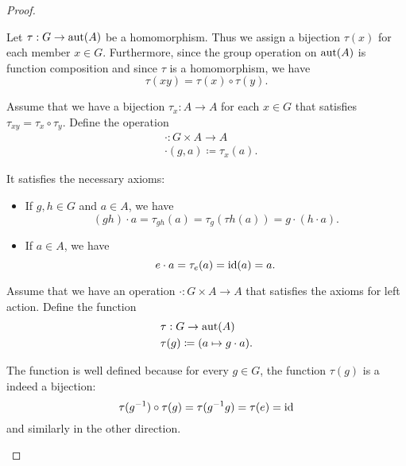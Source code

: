 \begin{proof}
  \begin{description}
     Let \( \tau: G \to \operatorname{aut}(A) \) be a homomorphism. Thus we assign a bijection \( \tau(x) \) for each member \( x \in G \). Furthermore, since the group operation on \( \operatorname{aut}(A) \) is function composition and since \( \tau \) is a homomorphism, we have
    \begin{equation*}
      \tau(xy) = \tau(x) \circ \tau(y).
    \end{equation*}

     Assume that we have a bijection \( \tau_x: A \to A \) for each \( x \in G \) that satisfies \( \tau_{xy} = \tau_x \circ \tau_y \). Define the operation
    \begin{align*}
      &\cdot: G \times A \to A \\
      &\cdot(g, a) \coloneqq \tau_x(a).
    \end{align*}

    It satisfies the necessary axioms:
    \begin{itemize}
      \item If \( g, h \in G \) and \( a \in A \), we have
      \begin{equation*}
        (g h) \cdot a
        =
        \tau_{g h}(a)
        =
        \tau_{g}(\tau{h}(a))
        =
        g \cdot (h \cdot a).
      \end{equation*}

      \item If \( a \in A \), we have
      \begin{equation*}
        e \cdot a
        =
        \tau_e(a)
        =
        \operatorname{id}(a)
        =
        a.
      \end{equation*}
    \end{itemize}

     Assume that we have an operation \( \cdot: G \times A \to A \) that satisfies the axioms for left action. Define the function
    \begin{align*}
      &\tau: G \to \operatorname{aut}(A) \\
      &\tau(g) \coloneqq (a \mapsto g \cdot a).
    \end{align*}

    The function is well defined because for every \( g \in G \), the function \( \tau(g) \) is a indeed a bijection:
    \begin{equation*}
      \tau(g^{-1}) \circ \tau(g)
      =
      \tau(g^{-1} g)
      =
      \tau(e)
      =
      \operatorname{id}
    \end{equation*}
    and similarly in the other direction.


\end{description}
\end{proof}
